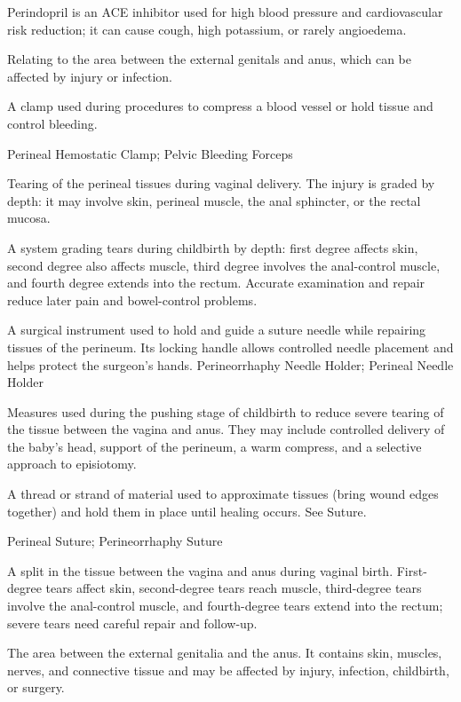  Perindopril is an ACE inhibitor used for high blood pressure and cardiovascular risk reduction; it can cause cough, high potassium, or rarely angioedema.

 Relating to the area between the external genitals and anus, which can be affected by injury or infection.

 A clamp used during procedures to compress a blood vessel or hold tissue and control bleeding.

\synonyms
Perineal Hemostatic Clamp; Pelvic Bleeding Forceps

 Tearing of the perineal tissues during vaginal delivery. The injury is graded by depth:
it may involve skin, perineal muscle, the anal sphincter, or the rectal mucosa.

 A system grading tears during childbirth by depth: first degree affects skin, second degree also affects muscle, third degree involves the anal-control muscle, and fourth degree extends into the rectum. Accurate examination and repair reduce later pain and bowel-control problems.

 A surgical instrument used to hold and guide a suture needle while repairing tissues of the perineum. Its locking handle allows controlled needle placement and helps protect the surgeon’s hands.
\synonyms
Perineorrhaphy Needle Holder; Perineal Needle Holder

 Measures used during the pushing stage of childbirth to reduce severe tearing of the tissue between the vagina and anus. They may include controlled delivery of the baby’s head, support of the perineum, a warm compress, and a selective approach to episiotomy.

 A thread or strand of material used to approximate tissues (bring wound edges together)
and hold them in place until healing occurs. See Suture.

\synonyms
Perineal Suture; Perineorrhaphy Suture

 A split in the tissue between the vagina and anus during vaginal birth. First-degree tears affect skin, second-degree tears reach muscle, third-degree tears involve the anal-control muscle, and fourth-degree tears extend into the rectum; severe tears need careful repair and follow-up.

 The area between the external genitalia and the anus. It contains skin, muscles, nerves, and connective tissue and may be affected by injury, infection, childbirth, or surgery.

